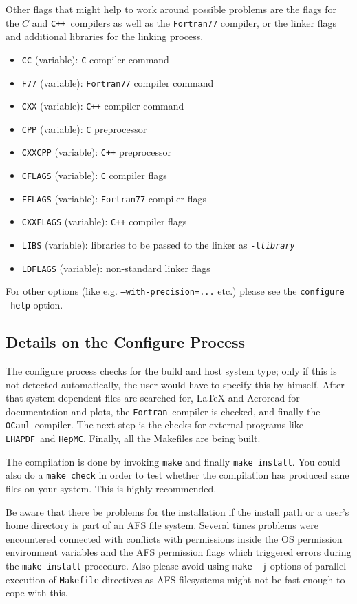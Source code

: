 \documentclass[12pt]{book}
\newcommand{\ttt}[1]{\texttt{#1}}
\newcommand{\lhapdf}{\ttt{LHAPDF}}
\newcommand{\cpp}{\ttt{C++}}
\newcommand{\fortran}{\ttt{Fortran}}
\newcommand{\ocaml}{\ttt{OCaml}}
\begin{document}
Other flags that might help to work around possible problems are the
flags for the $C$ and \cpp\  compilers as well as the \ttt{Fortran77}
compiler, or the linker flags and additional libraries for the linking
process.
\begin{itemize}
\item
  \ttt{CC} (variable): \ttt{C} compiler command
\item
  \ttt{F77} (variable): \ttt{Fortran77} compiler command
\item
  \ttt{CXX} (variable): \ttt{C++} compiler command
\item
  \ttt{CPP} (variable): \ttt{C} preprocessor
\item
  \ttt{CXXCPP} (variable): \ttt{C++} preprocessor
\item
  \ttt{CFLAGS} (variable): \ttt{C} compiler flags
\item
  \ttt{FFLAGS} (variable): \ttt{Fortran77} compiler flags
\item
  \ttt{CXXFLAGS} (variable): \ttt{C++} compiler flags
\item
  \ttt{LIBS} (variable): libraries to be passed to the linker as
  \ttt{-l{\em library}}
\item
  \ttt{LDFLAGS} (variable): non-standard linker flags
\end{itemize}

For other options (like e.g. \ttt{--with-precision=...} etc.) please
see the \ttt{configure --help} option.


\subsection{Details on the Configure Process}

The configure process checks for the build and host system type; only
if this is not detected automatically, the user would have to specify
this by himself. After that system-dependent files are searched for,
LaTeX and Acroread for documentation and plots, the \fortran\ compiler
is checked, and finally the \ocaml\ compiler. The next step is the
checks for external programs like \lhapdf\ and \ttt{HepMC}.
Finally, all the Makefiles are being built.

The compilation is done by invoking \ttt{make} and finally
\ttt{make install}. You could also do a \ttt{make check} in
order to test whether the compilation has produced sane files on your
system. This is highly recommended.

Be aware that there be problems for the installation if the install
path or a user's home directory is part of an AFS file system. Several
times problems were encountered connected with conflicts with
permissions inside the OS permission environment variables and the AFS
permission flags which triggered errors during the \ttt{make install}
procedure. Also please avoid using \ttt{make -j} options of parallel
execution of \ttt{Makefile} directives as AFS filesystems might not be
fast enough to cope with this.
\end{document}
